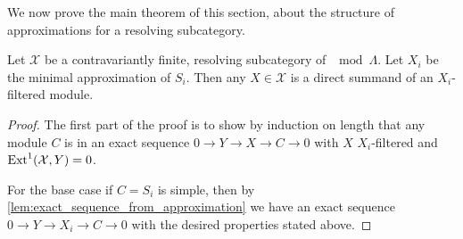 We now prove the main theorem of this section, about the structure of approximations for a resolving subcategory.

\begin{theorem} \cite[3.8]{AR91} \label{thm:contravariantly_finite_resolving_is_Xi_filtered}
	Let $\mathcal X$ be a contravariantly finite, resolving subcategory of $\mod \Lambda$. Let $X_i$ be the minimal approximation of $S_i$. Then any $X \in \mathcal X$ is a direct summand of an $X_i$-filtered module.
	\begin{proof}
		The first part of the proof is to show by induction on length that any module $C$ is in an exact sequence $0 \to Y \to X \to C \to 0$ with $X$ $X_i$-filtered and $\operatorname{Ext}^1(\mathcal X, Y)=0$.
		
		For the base case if $C=S_i$ is simple, then by \cref{lem:exact_sequence_from_approximation} we have an exact sequence $0 \to Y \to X_i \to C \to 0$ with the desired properties stated above. 
		

\end{proof}
\end{theorem}
